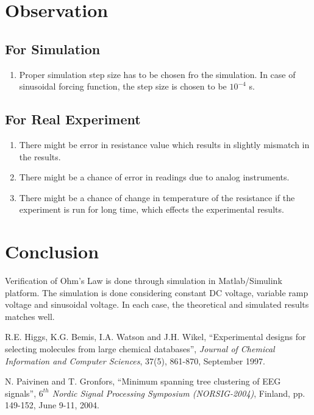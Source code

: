 \section{Observation}
\subsection{For Simulation}
\begin{enumerate}
    \item Proper simulation step size has to be chosen fro the simulation. In case of sinusoidal forcing function, the step size is chosen to be $10^{-4}$ s.
\end{enumerate}
\subsection{For Real Experiment}
\begin{enumerate}
    \item There might be error in resistance value which results in slightly mismatch in the results.
    \item There might be a chance of error in readings due to analog instruments.
    \item There might be a chance of change in temperature of the resistance if the experiment is run for long time, which effects the experimental results.
\end{enumerate}

\section{Conclusion}
\hspace{1.5cm} Verification of Ohm's Law is done through simulation in Matlab/Simulink platform. The simulation is done considering constant DC voltage, variable ramp voltage and sinusoidal voltage. In each case, the theoretical and simulated results matches well.

\begin{thebibliography}{15}

     R.E. Higgs, K.G. Bemis, I.A. Watson and J.H. Wikel, “Experimental designs for selecting molecules from large chemical databases”, \textit{Journal of Chemical Information and Computer Sciences}, 37(5), 861-870, September 1997.

     N. Paivinen and T. Gronfors, “Minimum spanning tree clustering of EEG signals”, \textit{$6^{th}$ Nordic Signal Processing Symposium (NORSIG-2004)}, Finland, pp. 149-152, June 9-11, 2004.

\end{thebibliography}
\pagebreak

